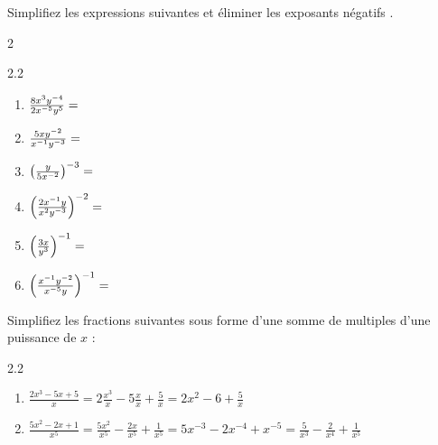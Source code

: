 \documentclass[main.tex]{subfiles}
\begin{document}
\begin{exercise}  Simplifiez les expressions suivantes  et éliminer les exposants négatifs .\hfill \vspace{-0.8em}
	\begin{multicols}{2}
		\begin{spacing}{2.2}	
			\begin{enumerate}[label={},leftmargin=*]
				\item $\frac{8x^3y^{-4}}{2x^{-5}y^5} =\dotfill $  
				\item $\frac{5xy^{-2}}{x^{-1}y^{-3}}=\dotfill $  
				\item $\left(\frac{y}{5x^{-2}}\right)^{-3}=\dotfill $  
				\item $\left(\frac{2x^{-1}y}{x^2y^{-3}}\right)^{-2}=\dotfill $  
				\item $\left(\frac{3x}{y^3}\right)^{-1}=\dotfill $ 
				\item $\left(\frac{x^{-1}y^{-2}}{x^{-5}y}\right)^{-1}=\dotfill $ 
			\end{enumerate}
		\end{spacing}\vspace{-0.5em}
	\end{multicols} 
\end{exercise} 
\begin{example}  Simplifiez les fractions suivantes sous forme d'une somme de multiples d'une puissance de $x$ :\hfill \vspace{-0.5em} 
		\begin{spacing}{2.2} 
			\begin{enumerate}[label={},leftmargin=*]
				\item $\frac{2x^3-5x+5}{x}=2\frac{x^3}{x}-5\frac{x}{x}+\frac{5}{x}=2x^2-6+\frac{5}{x}$
				\item $\frac{5x^2-2x+1}{x^5}=\frac{5x^2}{x^5}-\frac{2x}{x^5}+\frac{1}{x^5}=5x^{-3}-2x^{-4}+x^{-5}=\frac{5}{x^3}-\frac{2}{x^4}+\frac{1}{x^5}$ 
			\end{enumerate}
		\end{spacing}	 \vspace{-1em} 
\end{example}
\end{document}
